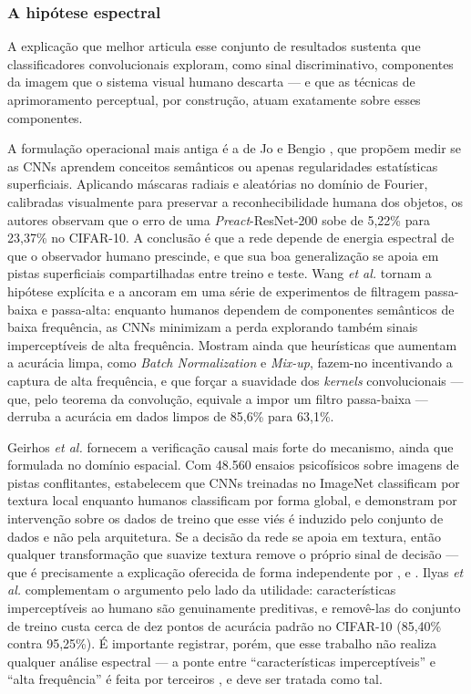 \documentclass[conference]{IEEEtran}
\begin{document}
\subsubsection{A hipótese espectral}

A explicação que melhor articula esse conjunto de resultados sustenta que
classificadores convolucionais exploram, como sinal discriminativo,
componentes da imagem que o sistema visual humano descarta --- e que as
técnicas de aprimoramento perceptual, por construção, atuam exatamente sobre
esses componentes.

A formulação operacional mais antiga é a de Jo e Bengio \cite{b14}, que propõem
medir se as CNNs aprendem conceitos semânticos ou apenas regularidades
estatísticas superficiais. Aplicando máscaras radiais e aleatórias no domínio
de Fourier, calibradas visualmente para preservar a reconhecibilidade humana
dos objetos, os autores observam que o erro de uma \textit{Preact}-ResNet-200
sobe de 5,22\% para 23,37\% no CIFAR-10. A conclusão é que a rede depende de
energia espectral de que o observador humano prescinde, e que sua boa
generalização se apoia em pistas superficiais compartilhadas entre treino e
teste. Wang \textit{et al.} \cite{b15} tornam a hipótese explícita e a ancoram
em uma série de experimentos de filtragem passa-baixa e passa-alta: enquanto
humanos dependem de componentes semânticos de baixa frequência, as CNNs
minimizam a perda explorando também sinais imperceptíveis de alta frequência.
Mostram ainda que heurísticas que aumentam a acurácia limpa, como
\textit{Batch Normalization} e \textit{Mix-up}, fazem-no incentivando a captura
de alta frequência, e que forçar a suavidade dos \textit{kernels}
convolucionais --- que, pelo teorema da convolução, equivale a impor um filtro
passa-baixa --- derruba a acurácia em dados limpos de 85,6\% para 63,1\%.

Geirhos \textit{et al.} \cite{b16} fornecem a verificação causal mais forte do
mecanismo, ainda que formulada no domínio espacial. Com 48.560 ensaios
psicofísicos sobre imagens de pistas conflitantes, estabelecem que CNNs
treinadas no ImageNet classificam por textura local enquanto humanos
classificam por forma global, e demonstram por intervenção sobre os dados de
treino que esse viés é induzido pelo conjunto de dados e não pela arquitetura.
Se a decisão da rede se apoia em textura, então qualquer transformação que
suavize textura remove o próprio sinal de decisão --- que é precisamente a
explicação oferecida de forma independente por \cite{b1}, \cite{b2} e
\cite{b8}. Ilyas \textit{et al.} \cite{b17} complementam o argumento pelo lado
da utilidade: características imperceptíveis ao humano são genuinamente
preditivas, e removê-las do conjunto de treino custa cerca de dez pontos de
acurácia padrão no CIFAR-10 (85,40\% contra 95,25\%). É importante registrar,
porém, que esse trabalho não realiza qualquer análise espectral --- a ponte
entre ``características imperceptíveis'' e ``alta frequência'' é feita por
terceiros \cite{b18}, e deve ser tratada como tal.
\end{document}

